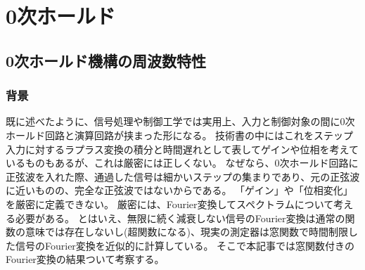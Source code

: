\chapter{0次ホールド}
    \section{0次ホールド機構の周波数特性}
        \label{0次ホールド機構の周波数特性}
        \subsection{背景}
            既に述べたように、信号処理や制御工学では実用上、入力と制御対象の間に0次ホールド回路と演算回路が挟まった形になる。
            技術書の中にはこれをステップ入力に対するラプラス変換の積分と時間遅れとして表してゲインや位相を考えているものもあるが、これは厳密には正しくない。
            なぜなら、0次ホールド回路に正弦波を入れた際、通過した信号は細かいステップの集まりであり、元の正弦波に近いものの、完全な正弦波ではないからである。
            「ゲイン」や「位相変化」を厳密に定義できない。
            厳密には、Fourier変換してスペクトラムについて考える必要がある。
            とはいえ、無限に続く減衰しない信号のFourier変換は通常の関数の意味では存在しないし(超関数になる)、現実の測定器は窓関数で時間制限した信号のFourier変換を近似的に計算している。
            そこで本記事では窓関数付きのFourier変換の結果ついて考察する。
